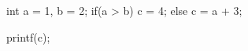 \begin{minipage}[t]{2.5in}
\begin{AVerb}[numbers=left]
int a = 1, b = 2;
if(a > b) 
  c = 4;
else     
  c = a + 3;

printf(c);
\end{AVerb}
\end{minipage}
